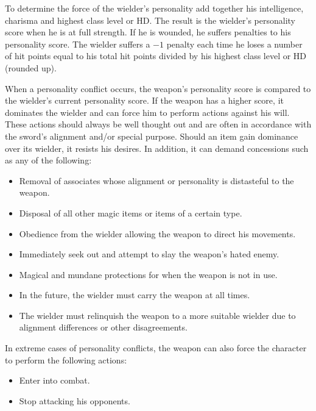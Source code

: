 \begin{multicols}{2}
To determine the force of the wielder's personality add together his intelligence, charisma and highest class level or HD.  The result is the wielder's personality score when he is at full strength.  If he is wounded, he suffers penalties to his personality score.  The wielder suffers a $-1$ penalty each time he loses a number of hit points equal to his total hit points divided by his highest class level or HD (rounded up).  

When a personality conflict occurs, the weapon's personality score is compared to the wielder's current personality score.  If the weapon has a higher score, it dominates the wielder and can force him to perform actions against his will.  These actions should always be well thought out and are often in accordance with the sword's alignment and/or special purpose.  Should an item gain dominance over its wielder, it resists his desires.  In addition, it can demand concessions such as any of the following:

\begin{itemize}
\item Removal of associates whose alignment or personality is distasteful to the weapon.

\item Disposal of all other magic items or items of a certain type.

\item Obedience from the wielder allowing the weapon to direct his movements.

\item Immediately seek out and attempt to slay the weapon's hated enemy.

\item Magical and mundane protections for when the weapon is not in use.

\item In the future, the wielder must carry the weapon at all times.

\item The wielder must relinquish the weapon to a more suitable wielder due to alignment differences or other disagreements.
\end{itemize}

In extreme cases of personality conflicts, the weapon can also force the character to perform the following actions: 

\begin{itemize}
\item Enter into combat.

\item Stop attacking his opponents.


\end{itemize}
\end{multicols}
